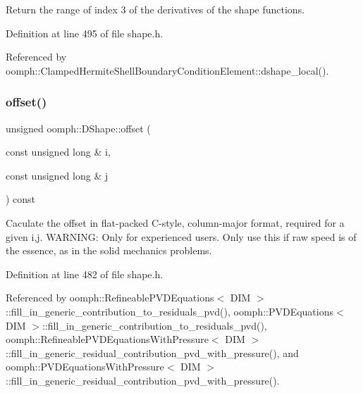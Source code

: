 Return the range of index 3 of the derivatives of the shape functions. 



Definition at line 495 of file shape.\+h.



Referenced by oomph\+::\+Clamped\+Hermite\+Shell\+Boundary\+Condition\+Element\+::dshape\+\_\+local().

\mbox{\label{classoomph_1_1DShape_a2ab233f026b70956e8ab520470ef20ec}} 
\subsubsection{\texorpdfstring{offset()}{offset()}}
{\footnotesize\ttfamily unsigned oomph\+::\+D\+Shape\+::offset (\begin{DoxyParamCaption}\item[{const unsigned long \&}]{i,  }\item[{const unsigned long \&}]{j }\end{DoxyParamCaption}) const\hspace{0.3cm}{\ttfamily [inline]}}



Caculate the offset in flat-\/packed C-\/style, column-\/major format, required for a given i,j. W\+A\+R\+N\+I\+NG\+: Only for experienced users. Only use this if raw speed is of the essence, as in the solid mechanics problems. 



Definition at line 482 of file shape.\+h.



Referenced by oomph\+::\+Refineable\+P\+V\+D\+Equations$<$ D\+I\+M $>$\+::fill\+\_\+in\+\_\+generic\+\_\+contribution\+\_\+to\+\_\+residuals\+\_\+pvd(), oomph\+::\+P\+V\+D\+Equations$<$ D\+I\+M $>$\+::fill\+\_\+in\+\_\+generic\+\_\+contribution\+\_\+to\+\_\+residuals\+\_\+pvd(), oomph\+::\+Refineable\+P\+V\+D\+Equations\+With\+Pressure$<$ D\+I\+M $>$\+::fill\+\_\+in\+\_\+generic\+\_\+residual\+\_\+contribution\+\_\+pvd\+\_\+with\+\_\+pressure(), and oomph\+::\+P\+V\+D\+Equations\+With\+Pressure$<$ D\+I\+M $>$\+::fill\+\_\+in\+\_\+generic\+\_\+residual\+\_\+contribution\+\_\+pvd\+\_\+with\+\_\+pressure().

\mbox{\label{classoomph_1_1DShape_aca7a3b5a8112835db2da558ab275d1a5}} 

